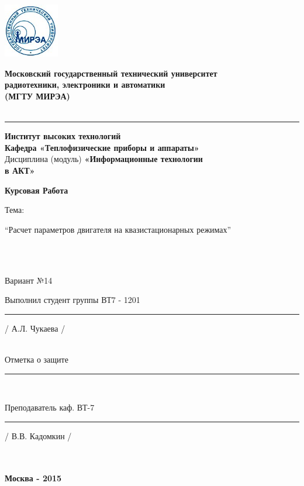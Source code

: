 \documentclass{article}
\begin{document}
\includegraphics[width=2.4cm]{mirea} 
\begin{center}
\begin{LARGE}
\textbf{Московский государственный технический университет}\\
\textbf{радиотехники, электроники и автоматики}\\
\textbf{(МГТУ МИРЭА)} \\
~\\
\hrule \vspace {10pt}
\textbf{Институт высоких технологий} \\

\textbf{Кафедра «Теплофизические приборы и аппараты»} \\
Дисциплина (модуль) \textbf{«Информационные технологии\\
в АКТ»} \\
\end{LARGE}
\begin{Huge}
\textbf{Курсовая Работа}\\
\end{Huge}
\begin{large}
Тема: 
\end{large}
\begin{normalsize}
“Расчет параметров двигателя на квазистационарных режимах” \\
\end{normalsize}
~\\
~\\
\begin{large}
Вариант №14\\

\end{large}
\end{center}
\begin{flushright}
Выполнил студент группы ВТ7 - 1201\\
\rule{4cm}{0.01pt} / А.Л. Чукаева / \\
~\\
\end{flushright}
\begin{flushleft}
Отметка о защите \rule{5cm}{0.01pt} \\
\end{flushleft}
\begin{flushright}

Преподаватель каф. ВТ-7 \\
\rule{4cm}{0.01pt} / В.В. Кадомкин / \\
~\\
~\\
\end{flushright}
\begin{center}
\textbf{Москва - 2015}
\end{center}
\end{document}
